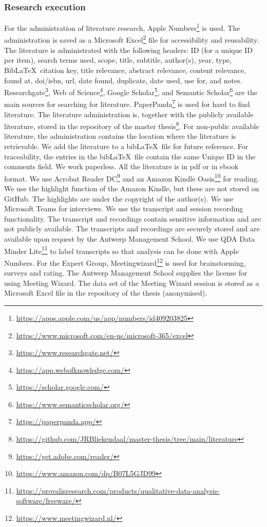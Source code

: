 \subsubsection{Research execution}
\label{subsub:tbresearchexecution}
For the administration of literature research, Apple Numbers\footnote{\url{https://apps.apple.com/us/app/numbers/id409203825}} is used. The administration is saved as a Microsoft Excel\footnote{\url{https://www.microsoft.com/en-us/microsoft-365/excel}} file for accessibility and reusability. The literature is administrated with the following headers: ID (for a unique ID per item), search terms used, scope, title, subtitle, author(s), year, type, Bib\LaTeX\ citation key, title relevance, abstract relevance, content relevance, found at, doi/isbn, url, date found, duplicate, date used, use for, and notes. Researchgate\footnote{\url{https://www.researchgate.net/}}, Web of Science\footnote{\url{https://app.webofknowledge.com/}}, Google Scholar\footnote{\url{https://scholar.google.com/}}, and Semantic Scholar\footnote{\url{https://www.semanticscholar.org/}} are the main sources for searching for literature. PaperPanda\footnote{\url{https://paperpanda.app/}} is used for hard to find literature. The literature administration is, together with the publicly available literature, stored in the repository of the master thesis\footnote{\url{https://github.com/JRBliekendaal/master-thesis/tree/main/literature}}. For non-public available literature, the administration contains the location where the literature is retrievable. We add the literature to a bib\LaTeX\ file for future reference. For traceability, the entries in the bib\LaTeX\ file contain the same Unique ID in the comments field. We work paperless. All the literature is in pdf or in ebook format. We use Acrobat Reader DC\footnote{\url{https://get.adobe.com/reader/}} and an Amazon Kindle Oasis\footnote{\url{https://www.amazon.com/dp/B07L5GJD99}} for reading. We use the highlight function of the Amazon Kindle, but these are not stored on GitHub. The highlights are under the copyright of the author(s). We use Microsoft Teams for interviews. We use the transcript and session recording functionality. The transcript and recordings contain sensitive information and are not publicly available. The transcripts and recordings are securely stored and are available upon request by the Antwerp Management School. We use QDA Data Minder Lite\footnote{\url{https://provalisresearch.com/products/qualitative-data-analysis-software/freeware/}} to label transcripts so that analysis can be done with Apple Numbers. For the Expert Group, Meetingwizard\footnote{\url{https://www.meetingwizard.nl/}} is used for brainstorming, surveys and rating. The Antwerp Management School supplies the license for using Meeting Wizard. The data set of the Meeting Wizard session is stored as a Microsoft Excel file in the repository of the thesis (anonymised).
